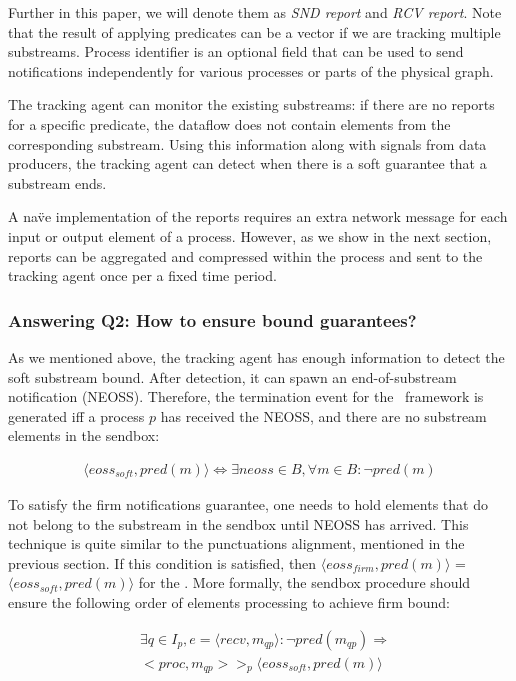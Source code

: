 Further in this paper, we will denote them as {\em SND report} and {\em RCV report}. Note that the result of applying predicates can be a vector if we are tracking multiple substreams. Process identifier is an optional field that can be used to send notifications independently for various processes or parts of the physical graph.

The tracking agent can monitor the existing substreams: if there are no reports for a specific predicate, the dataflow does not contain elements from the corresponding substream. Using this information along with signals from data producers, the tracking agent can detect when there is a soft guarantee that a substream ends.

A na\"ve implementation of the reports requires an extra network message for each input or output element of a process. However, as we show in the next section, reports can be aggregated and compressed within the process and sent to the tracking agent once per a fixed time period.

\subsubsection{Answering Q2: How to ensure bound guarantees?}

As we mentioned above, the tracking agent has enough information to detect the soft substream bound. After detection, it can spawn an end-of-substream notification (NEOSS). Therefore, the termination event for the \tracker\ framework is generated iff a process $p$ has received the NEOSS, and there are no substream elements in the sendbox:

\begin{align*}
\langle eoss_{soft}, pred(m)\rangle \Longleftrightarrow \exists neoss \in B, \forall m\in B : \neg pred(m)
\end{align*}

To satisfy the firm notifications guarantee, one needs to hold elements that do not belong to the substream in the sendbox until NEOSS has arrived. This technique is quite similar to the punctuations alignment, mentioned in the previous section. If this condition is satisfied, then $\langle eoss_{firm}, pred(m)\rangle$ = $\langle eoss_{soft}, pred(m)\rangle$ for the \tracker. More formally, the sendbox procedure should ensure the following order of elements processing to achieve firm bound:

\begin{align*}
& \exists q \in I_p, e = \langle recv,m_{qp} \rangle : \neg pred(m_{qp}) \Longrightarrow \\ 
& <proc, m_{qp}> >_p \langle eoss_{soft}, pred(m)\rangle
\end{align*} 

